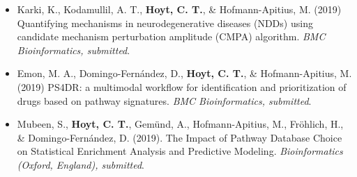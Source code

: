 \begin{itemize}
    \item Karki, K., Kodamullil, A. T., \textbf{Hoyt, C. T.}, \& Hofmann-Apitius, M. (2019) Quantifying mechanisms in neurodegenerative diseases (NDDs) using candidate mechanism perturbation amplitude (CMPA) algorithm. \textit{BMC Bioinformatics, submitted}.
    \item Emon, M. A., Domingo-Fern\'{a}ndez, D., \textbf{Hoyt, C. T.}, \& Hofmann-Apitius, M. (2019) PS4DR: a multimodal workflow for identification and prioritization of drugs based on pathway signatures. \textit{BMC Bioinformatics, submitted}.
    \item Mubeen, S., \textbf{Hoyt, C. T.}, Gem\"{u}nd, A., Hofmann-Apitius, M., Fr\"{o}hlich, H., \& Domingo-Fern\'{a}ndez, D. (2019). The Impact of Pathway Database Choice on Statistical Enrichment Analysis and Predictive Modeling. \textit{Bioinformatics (Oxford, England), submitted}.
\end{itemize}

\tableofcontents
\listoffigures
\listoftables
